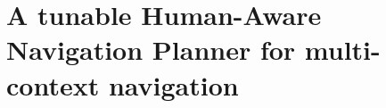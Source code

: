 \ifdefined{}
\else
\setcounter{chapter}{3} %
\dominitoc
\faketableofcontents
\fi

\chapter{A tunable Human-Aware Navigation Planner for multi-context navigation}
\label{chap:4}
\minitoc


